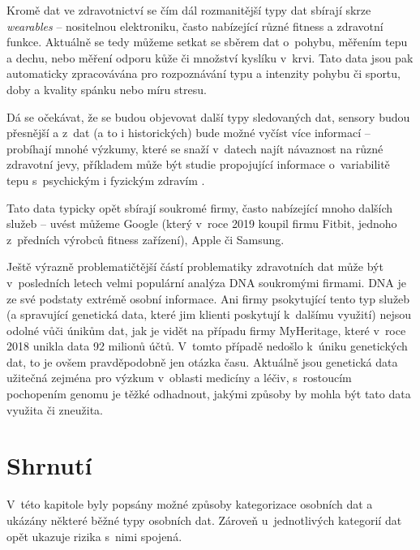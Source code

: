 Kromě dat ve zdravotnictví se čím dál rozmanitější typy dat sbírají skrze \textit{wearables} -- nositelnou elektroniku, často nabízející různé fitness a zdravotní funkce. Aktuálně se tedy můžeme setkat se sběrem dat o~pohybu, měřením tepu a dechu, nebo měření odporu kůže či množství kyslíku v~krvi.
Tato data jsou pak automaticky zpracovávána pro rozpoznávání typu a intenzity pohybu či sportu, doby a kvality spánku nebo míru stresu.

Dá se očekávat, že se budou objevovat další typy sledovaných dat, sensory budou přesnější a z~dat (a to i historických) bude možné vyčíst více informací -- probíhají mnohé výzkumy, které se snaží v~datech najít návaznost na různé zdravotní jevy, příkladem může být studie propojující informace o~variabilitě tepu s~psychickým i fyzickým zdravím \citep{heart-rate-health}.

Tato data typicky opět sbírají soukromé firmy, často nabízející mnoho dalších služeb -- uvést můžeme Google (který v~roce 2019 koupil firmu Fitbit, jednoho z~předních výrobců fitness zařízení), Apple či Samsung.

Ještě výrazně problematičtější částí problematiky zdravotních dat může být v~posledních letech velmi populární analýza DNA soukromými firmami. DNA je ze své podstaty extrémě osobní informace. Ani firmy psokytující tento typ služeb (a spravující genetická data, které jim klienti poskytují k~dalšímu využití) nejsou odolné vůči únikům dat, jak je vidět na případu firmy MyHeritage, které v~roce 2018 unikla data 92 milionů účtů. V~tomto případě nedošlo k~úniku genetických dat, to je ovšem pravděpodobně jen otázka času. Aktuálně jsou genetická data užitečná zejména pro výzkum v~oblasti medicíny a léčiv, s~rostoucím pochopením genomu je těžké odhadnout, jakými způsoby by mohla být tato data využita či zneužita.


\section*{Shrnutí}
V~této kapitole byly popsány možné způsoby kategorizace osobních dat a ukázány některé běžné typy osobních dat.
Zároveň u~jednotlivých kategorií dat opět ukazuje rizika s~nimi spojená.